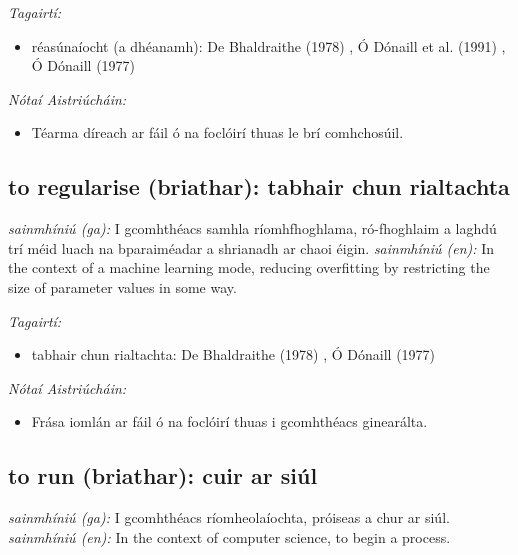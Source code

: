 \documentclass{article}
\begin{document}
 \noindent \textit{Tagairtí:}
\begin{itemize}
	\item réasúnaíocht (a dhéanamh): De Bhaldraithe (1978) \cite{de-bhaldraithe}, Ó Dónaill et al. (1991) \cite{focloir-beag}, Ó Dónaill (1977) \cite{odonaill}
\end{itemize}

 \noindent \textit{Nótaí Aistriúcháin:}
\begin{itemize}
	\item Téarma díreach ar fáil ó na foclóirí thuas le brí comhchosúil.
\end{itemize}


\subsection*{to regularise (briathar): tabhair chun rialtachta} 
 \noindent \textit{sainmhíniú (ga):} I gcomhthéacs samhla ríomhfhoghlama, ró-fhoghlaim a laghdú trí méid luach na bparaiméadar a shrianadh ar chaoi éigin.
\newline\newline
 \noindent \textit{sainmhíniú (en):} In the context of a machine learning mode, reducing overfitting by restricting the size of parameter values in some way.
\newline

 \noindent \textit{Tagairtí:}
\begin{itemize}
	\item tabhair chun rialtachta: De Bhaldraithe (1978) \cite{de-bhaldraithe}, Ó Dónaill (1977) \cite{odonaill}
\end{itemize}

 \noindent \textit{Nótaí Aistriúcháin:}
\begin{itemize}
	\item Frása iomlán ar fáil ó na foclóirí thuas i gcomhthéacs ginearálta.
\end{itemize}


\subsection*{to run (briathar): cuir ar siúl} 
 \noindent \textit{sainmhíniú (ga):} I gcomhthéacs ríomheolaíochta, próiseas a chur ar siúl.
\newline\newline
 \noindent \textit{sainmhíniú (en):} In the context of computer science, to begin a process.
\newline
\end{document}
